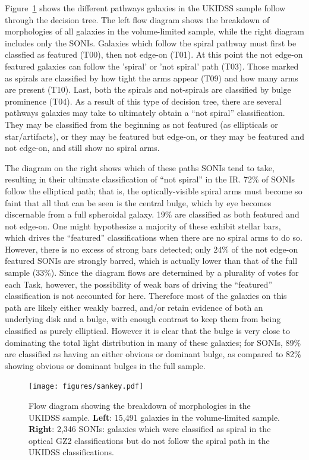 Figure~\ref{fig:sankey} shows the different pathways galaxies in the UKIDSS sample follow through the decision tree. The left flow diagram shows the breakdown of morphologies of all galaxies in the volume-limited sample, while the right diagram includes only the SONIs. Galaxies which follow the spiral pathway must first be classfied as featured (T00), then not edge-on (T01). At this point the not edge-on featured galaxies can follow the 'spiral' or 'not spiral' path (T03). Those marked as spirals are classified by how tight the arms appear (T09) and how many arms are present (T10). Last, both the spirals and not-spirals are classified by bulge prominence (T04). As a result of this type of decision tree, there are several pathways galaxies may take to ultimately obtain a ``not spiral'' classification. They may be classified from the beginning as not featured (as ellipticals or star/artifacts), or they may be featured but edge-on, or they may be featured and not edge-on, and still show no spiral arms.

The diagram on the right shows which of these paths SONIs tend to take, resulting in their ultimate classification of ``not spiral'' in the IR. 72\% of SONIs follow the elliptical path; that is, the optically-visible spiral arms must become so faint that all that can be seen is the central bulge, which by eye becomes discernable from a full spheroidal galaxy. 19\% are classified as both featured and not edge-on. One might hypothesize a majority of these exhibit stellar bars, which drives the ``featured'' classifications when there are no spiral arms to do so. However, there is no excess of strong bars detected; only 24\% of the not edge-on featured SONIs are strongly barred, which is actually lower than that of the full sample (33\%). Since the diagram flows are determined by a plurality of votes for each Task, however, the possibility of weak bars of driving the ``featured'' classification is not accounted for here. Therefore most of the galaxies on this path are likely either weakly barred, and/or retain evidence of both an underlying disk and a bulge, with enough contrast to keep them from being classified as purely elliptical. However it is clear that the bulge is very close to dominating the total light distribution in many of these galaxies; for SONIs, 89\% are classified as having an either obvious or dominant bulge, as compared to 82\% showing obvious or dominant bulges in the full sample. 



\begin{figure}
\centering
\texttt{[image: figures/sankey.pdf]}
\caption{Flow diagram showing the breakdown of morphologies in the UKIDSS sample. \textbf{Left}: 15,491 galaxies in the volume-limited sample. \textbf{Right}: 2,346 SONIs: galaxies which were classified as spiral in the optical GZ2 classifications but do not follow the spiral path in the UKIDSS classifications.}
\label{fig:sankey}
\end{figure}

